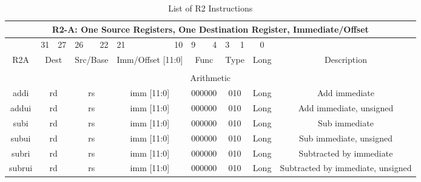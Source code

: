 \documentclass{article}
\begin{document}
    \begin{center}
    \begin{longtable}{|c|l|r|l|r|l|r|l|r|l|r|c|c|}
    \caption{List of R2 Instructions}
    \label{table:r2_instr} \\
    
                    \multicolumn{13}{c}{R2-A: One Source Registers, One Destination Register, Immediate/Offset} \\  
    \hline      &   \multicolumn{1}{l}{31}  &   27  &   \multicolumn{1}{l}{26}  &   22  &   \multicolumn{1}{l}{21}  &   10          &   \multicolumn{1}{l}{9}   &   4   &   \multicolumn{1}{l}{3}   &   1   &   0   & \\
    \hline R2A  &   \multicolumn{2}{|c|}{Dest}      &   \multicolumn{2}{|c|}{Src/Base}  &   \multicolumn{2}{|c|}{Imm/Offset [11:0]} &   \multicolumn{2}{|c|}{Func}      &   \multicolumn{2}{|c|}{Type}  &   Long    &   Description \\
    

    \hline              \multicolumn{13}{|c|}{} \\
    
                        \multicolumn{13}{|c|}{Arithmetic} \\
    \hline addi     &   \multicolumn{2}{|c|}{rd}    &   \multicolumn{2}{|c|}{rs}    &   \multicolumn{2}{|c|}{imm [11:0]}    &   \multicolumn{2}{|c|}{000000}    &   \multicolumn{2}{|c|}{010}   &   Long    &   Add immediate \\
    \hline addui    &   \multicolumn{2}{|c|}{rd}    &   \multicolumn{2}{|c|}{rs}    &   \multicolumn{2}{|c|}{imm [11:0]}    &   \multicolumn{2}{|c|}{000000}    &   \multicolumn{2}{|c|}{010}   &   Long    &   Add immediate, unsigned \\
    \hline subi     &   \multicolumn{2}{|c|}{rd}    &   \multicolumn{2}{|c|}{rs}    &   \multicolumn{2}{|c|}{imm [11:0]}    &   \multicolumn{2}{|c|}{000000}    &   \multicolumn{2}{|c|}{010}   &   Long    &   Sub immediate \\
    \hline subui    &   \multicolumn{2}{|c|}{rd}    &   \multicolumn{2}{|c|}{rs}    &   \multicolumn{2}{|c|}{imm [11:0]}    &   \multicolumn{2}{|c|}{000000}    &   \multicolumn{2}{|c|}{010}   &   Long    &   Sub immediate, unsigned \\
    \hline subri    &   \multicolumn{2}{|c|}{rd}    &   \multicolumn{2}{|c|}{rs}    &   \multicolumn{2}{|c|}{imm [11:0]}    &   \multicolumn{2}{|c|}{000000}    &   \multicolumn{2}{|c|}{010}   &   Long    &   Subtracted by immediate \\
    \hline subrui   &   \multicolumn{2}{|c|}{rd}    &   \multicolumn{2}{|c|}{rs}    &   \multicolumn{2}{|c|}{imm [11:0]}    &   \multicolumn{2}{|c|}{000000}    &   \multicolumn{2}{|c|}{010}   &   Long    &   Subtracted by immediate, unsigned \\
    

\end{longtable}
\end{center}
\end{document}
